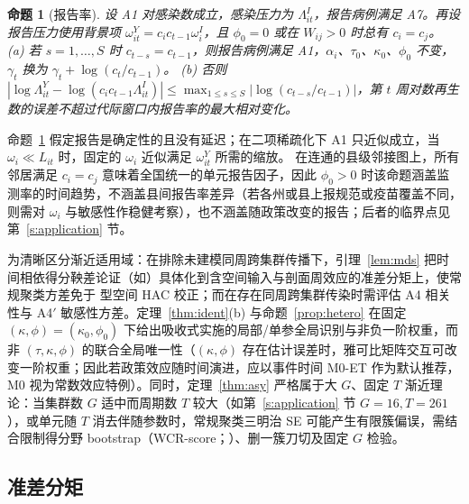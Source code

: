 \documentclass[11pt,a4paper]{ctexart}
\newtheorem{proposition}{命题}
\theoremstyle{definition}
\begin{document}
\begin{proposition}[报告率]
\label{prop:ascertainment}
设 A1 对感染数成立，感染压力为 $\Lambda^{I}_{it}$，报告病例满足 A7。再设报告压力使用背景项 $\omega^{Y}_{it}=c_ic_{t-1}\omega^{I}_i$，且 $\phi_0=0$ 或在 $W_{ij}>0$ 时总有 $c_i=c_j$。
(a) 若 $s=1,\dots,S$ 时 $c_{t-s}=c_{t-1}$，则报告病例满足 A1，$\alpha_i$、$\tau_0$、$\kappa_0$、$\phi_0$ 不变，$\gamma_t$ 换为 $\gamma_t+\log(c_t/c_{t-1})$。
(b) 否则 $|\log\Lambda^{Y}_{it}-\log(c_ic_{t-1}\Lambda^{I}_{it})|\le\max_{1\le s\le S}|\log(c_{t-s}/c_{t-1})|$，第 $t$ 周对数再生数的误差不超过代际窗口内报告率的最大相对变化。
\end{proposition}

命题~\ref{prop:ascertainment} 假定报告是确定性的且没有延迟；在二项稀疏化下 A1 只近似成立，当 $\omega_i\ll L_{it}$ 时，固定的 $\omega_i$ 近似满足 $\omega^Y_{it}$ 所需的缩放。
在连通的县级邻接图上，所有邻居满足 $c_i=c_j$ 意味着全国统一的单元报告因子，因此 $\phi_0>0$ 时该命题涵盖监测率的时间趋势，不涵盖县间报告率差异（若各州或县上报规范或疫苗覆盖不同，则需对 $\omega_i$ 与敏感性作稳健考察），也不涵盖随政策改变的报告；后者的临界点见第~\ref{s:application} 节。

为清晰区分渐近适用域：在排除未建模同周跨集群传播下，引理~\ref{lem:mds} 把时间相依得分鞅差论证（如\citealp{bong2024frequentist}）具体化到含空间输入与剖面周效应的准差分矩上，使常规聚类方差免于\citet{conley1999gmm} 型空间 HAC 校正；而在存在同周跨集群传染时需评估 A4 相关性与 A4$'$ 敏感性方差。定理~\ref{thm:ident}(b) 与命题~\ref{prop:hetero} 在固定 $(\kappa,\phi)=(\kappa_0,\phi_0)$ 下给出吸收式实施的局部/单参全局识别与非负一阶权重，而非 $(\tau,\kappa,\phi)$ 的联合全局唯一性（$(\kappa,\phi)$ 存在估计误差时，雅可比矩阵交互可改变一阶权重；因此若政策效应随时间演进，应以事件时间 M0-ET 作为默认推荐，M0 视为常数效应特例）。同时，定理~\ref{thm:asy} 严格属于大 $G$、固定 $T$ 渐近理论：当集群数 $G$ 适中而周期数 $T$ 较大（如第~\ref{s:application} 节 $G=16, T=261$），或单元随 $T$ 消去伴随参数时，常规聚类三明治 SE 可能产生有限簇偏误\citep{cameron2008bootstrap,imbens2016robust,mackinnon2018few}，需结合限制得分野 bootstrap（WCR-score；\citealp{kline2012score,webb2023reworking}）、删一簇刀切\citep{mackinnon2023guide,mackinnon2023jackknife}及固定 $G$ 检验\citep{ibragimov2010tstat,bester2011inference,hwang2021simple}。

\subsection{准差分矩}
\label{ss:moments}
\end{document}
